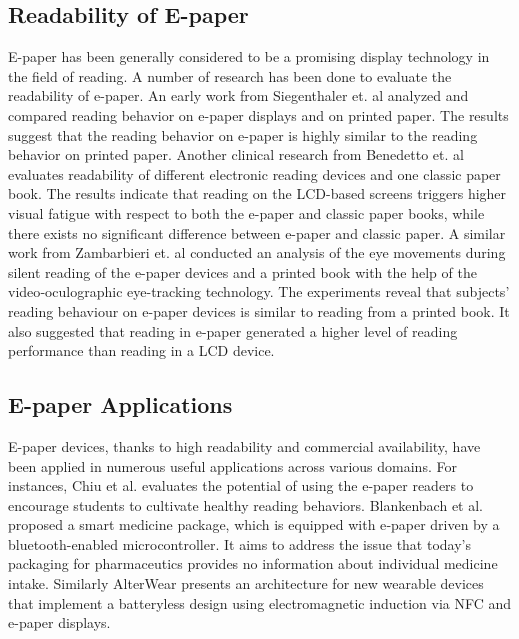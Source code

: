 \documentclass[]{sigchi}
\begin{document}
\subsection{Readability of E-paper}
E-paper has been generally considered to be a promising display technology in the field of reading. A number of research has been done to evaluate the readability of e-paper.
An early work from Siegenthaler et. al \cite{siegenthaler2011comparing,siegenthaler2010improving} analyzed and compared reading behavior on e-paper displays and on printed paper. The results suggest that the reading behavior on e-paper is highly similar to the reading behavior on printed paper. Another clinical research from Benedetto et. al \cite{benedetto2013readers,benedetto2014effects} evaluates readability of different electronic reading devices and one classic paper book. The results indicate that reading on the LCD-based screens triggers higher visual fatigue with respect to both the e-paper  and classic paper books, while there exists no significant difference between e-paper and classic paper. A similar work from Zambarbieri et. al \cite{zambarbieri2012eye} conducted an analysis of the eye movements during silent reading of the e-paper devices and a printed book  with the help of the video‐oculographic eye-tracking technology. The experiments reveal that subjects' reading behaviour on e-paper devices is similar to reading from a printed book. It also suggested that reading in e-paper generated a higher level of reading performance than reading in a LCD device. 

\subsection{E-paper Applications}
E-paper devices, thanks to high readability and commercial availability, have been applied in numerous useful applications across various domains.
For instances, Chiu et al. \cite{chiu2018interactive} evaluates the potential of using the e-paper readers to encourage students to cultivate healthy reading behaviors. Blankenbach et al. \cite{blankenbach201822} proposed a smart medicine package, which is equipped with e‐paper driven by a bluetooth-enabled microcontroller. It aims to address the issue that today's packaging for pharmaceutics provides no information about individual medicine intake. Similarly AlterWear \cite{dierk2018alterwear} presents an architecture for new wearable devices that implement a batteryless design using electromagnetic induction via NFC and e-paper displays. 
\end{document}
